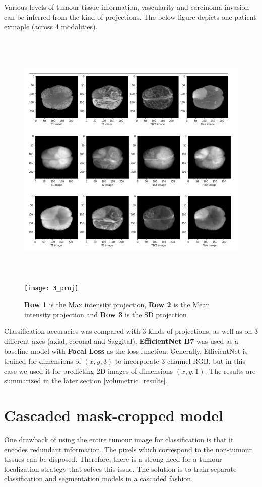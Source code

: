  Various levels of tumour tissue information, vascularity and carcinoma invasion can be inferred from the kind of projections. The below figure depicts one patient exmaple (across 4 modalities).
\begin{figure}[H]
  \begin{center}
    \leavevmode
    \ifpdf
      \includegraphics[height=5in]{Methodology/Chapter3Figs/3_projections.png}
    \else
      \texttt{[image: 3\_proj]}
    \fi
    \caption{\textbf{Row 1} is the Max intensity projection, \textbf{Row 2} is the Mean intensity projection and \textbf{Row 3} is the SD projection}
    \label{3_proj}
  \end{center}
\end{figure}

Classification accuracies was compared with 3 kinds of projections, as well as on 3 different axes (axial, coronal and Saggital). \textbf{EfficientNet B7} was used as a baseline model with \textbf{Focal Loss} as the loss function. Generally, EfficientNet is trained for dimensions of $(x,y,3)$ to incorporate 3-channel RGB, but in this case we used it for predicting 2D images of dimensions $(x,y,1)$.  The results are summarized in the later section \ref{volumetric_results}. 


\section{Cascaded mask-cropped model}\label{cropped_cascaded}
\vspace*{3mm}
One drawback of using the entire tumour image for classification is that it encodes redundant information. The pixels which correspond to the non-tumour tissues can be disposed. Therefore, there is a strong need for a tumour localization strategy that solves this issue. The solution is to train separate classification and segmentation models in a cascaded fashion. 
\vspace*{3mm}

